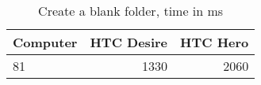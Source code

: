 \begin{table}
  \centering
  \caption{Create a blank folder, time in ms}
  \begin{tabular}{ | l | r | r |}
    \hline
   \textbf{Computer} & \textbf{HTC Desire} & \textbf{HTC Hero} \\ \hline
    81  &1330     &2060    \\ \hline
  \end{tabular}
  \label{tbl:folde:createblank}
\end{table}
